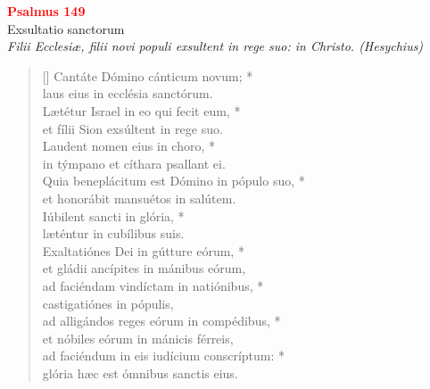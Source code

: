 


\def\greinitialformat#1{%
{\fontsize{39}{39}\selectfont #1}%
}




\vspace{0.3cm}
\begin{center}
 \textcolor{red}{\large \bf Psalmus 149}\\
Exsultatio sanctorum\\
\textit{\small Filii Ecclesiæ, filii novi populi exsultent in rege suo: in Christo. (Hesychius)}
\end{center}
\begin{verse}[\versewidth]
Cantáte Dómino cánticum novum; *\\
laus eius in ecclésia sanctórum.\\
\vin Lætétur Israel in eo qui fecit eum, *\\
\vin et fílii Sion exsúltent in rege suo.\\
Laudent nomen eius in choro, *\\
in týmpano et cíthara psallant ei.\\
\vin Quia beneplácitum est Dómino in pópulo suo, *\\
\vin et honorábit mansuétos in salútem.\\
Iúbilent sancti in glória, *\\
læténtur in cubílibus suis.\\
\vin Exaltatiónes Dei in gútture eórum, *\\
\vin et gládii ancípites in mánibus eórum,\\
ad faciéndam vindíctam in natiónibus, *\\
castigatiónes in pópulis,\\
\vin ad alligándos reges eórum in compédibus, *\\
\vin et nóbiles eórum in mánicis férreis,\\
ad faciéndum in eis iudícium conscríptum: *\\
glória hæc est ómnibus sanctis eius.\\
\end{verse}
\vspace{1cm}


